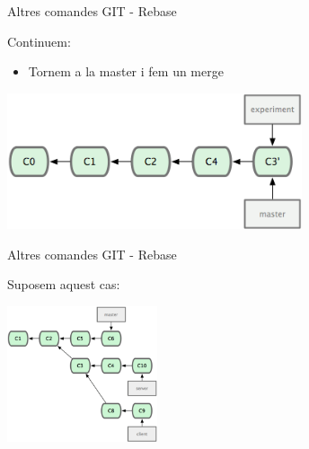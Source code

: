 \documentclass[10pt,xcolor={rgb}]{beamer}
\begin{document}
    \begin{frame}[fragile]{Altres comandes GIT - Rebase}

      \begin{block}{Continuem:}
      \begin{itemize}
        \item Tornem a la master i fem un merge
      \end{itemize}

      \centering
      \includegraphics[height=4cm]{rebase3.png}

      \end{block}
    \end{frame}

    \begin{frame}[fragile]{Altres comandes GIT - Rebase}

      \begin{block}{Suposem aquest cas:}

      \centering
      \includegraphics[height=4cm]{rebase4.png}

      \end{block}
    \end{frame}
\end{document}
